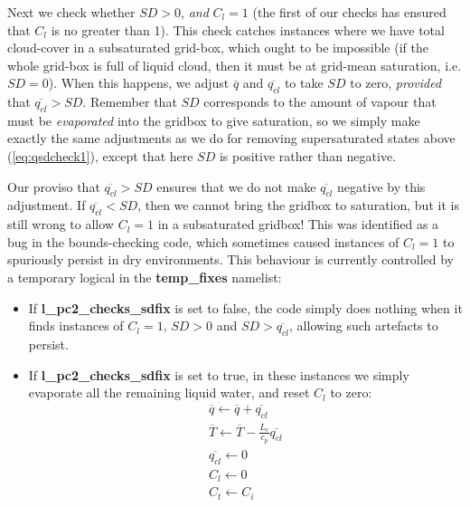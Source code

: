 \documentclass{UMDP_article}
\begin{document}
\subsubsection{}

Next we check whether $SD > 0$, {\it and} $C_l = 1$
(the first of our checks has ensured that $C_l$ is no greater than 1).
This check catches instances where we have total cloud-cover in a subsaturated
grid-box, which ought to be impossible (if the whole grid-box is full of liquid
cloud, then it must be at grid-mean saturation, i.e. $SD = 0$).
When this happens, we adjust $\overline{q}$ and $\overline{q_{cl}}$
to take $SD$ to zero,
\textit{provided} that $\overline{q_{cl}} > SD$. Remember that $SD$
corresponds to the amount of vapour that must be
\textit{evaporated} into the gridbox to give saturation, so we simply
make exactly the same adjustments as we do for removing supersaturated
states above (\ref{eq:qsdcheck1}), except that here $SD$ is positive rather
than negative.

Our proviso that $\overline{q_{cl}} > SD$ ensures that we do not make
$\overline{q_{cl}}$ negative by this adjustment.
If $\overline{q_{cl}} < SD$, then we cannot bring the gridbox to saturation,
but it is still wrong to allow $C_l = 1$ in a subsaturated gridbox!
This was identified as a bug in the bounds-checking code, which sometimes
caused instances of $C_l = 1$ to spuriously persist in dry environments.
This behaviour is currently controlled by a temporary logical in the
{\bf temp\_fixes} namelist:
\begin{itemize}
\item If {\bf l\_pc2\_checks\_sdfix} is set to false, the code simply does
nothing when it finds instances of $C_l = 1$, $SD > 0$ and
$SD > \overline{q_{cl}}$, allowing such artefacts to persist.
\item If {\bf l\_pc2\_checks\_sdfix} is set to true, in these instances
we simply evaporate all the remaining liquid water, and reset $C_l$ to zero:
\begin{eqnarray}
\overline{q} \leftarrow \overline{q} + \overline{q_{cl}}  \nonumber \\
\overline{T} \leftarrow \overline{T} - \frac{L_c}{c_p} \overline{q_{cl}}
\nonumber \\
\overline{q_{cl}} \leftarrow 0 \nonumber \\
C_l \leftarrow 0\nonumber \\
C_t \leftarrow C_i
\label{eq:qsdcheck2}
\end{eqnarray}
\end{itemize}
\end{document}
